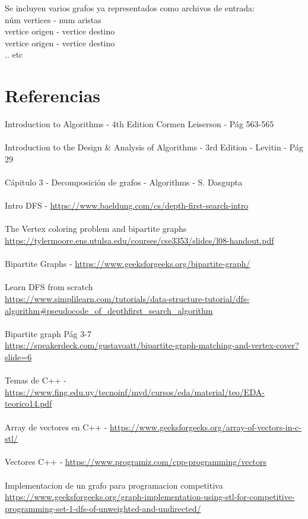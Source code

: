 \documentclass{article}
\begin{document}
Se incluyen varios grafos ya representados como archivos de entrada:\\
núm vertices - num aristas\\
vertice origen - vertice destino\\
vertice origen - vertice destino\\
.. etc\\




\section{Referencias}
Introduction to Algorithms - 4th Edition Cormen Leiserson - Pág 563-565\\\\
Introduction to the Design \& Analysis of Algorithms - 3rd Edition - Levitin - Pág 29\\\\
Cápitulo 3 - Decomposición de grafos - Algorithms - S. Dasgupta\\\\
Intro DFS - \url{https://www.baeldung.com/cs/depth-first-search-intro}\\\\
The Vertex coloring problem and bipartite graphs \\ \url{https://tylermoore.ens.utulsa.edu/courses/cse3353/slides/l08-handout.pdf}\\\\
Bipartite Graphs - \url{https://www.geeksforgeeks.org/bipartite-graph/}\\\\
Learn DFS from scratch \\ \url{https://www.simplilearn.com/tutorials/data-structure-tutorial/dfs-algorithm#pseudocode_of_depthfirst_search_algorithm}\\\\
Bipartite graph Pág 3-7 \\ \url{https://speakerdeck.com/gustavoatt/bipartite-graph-matching-and-vertex-cover?slide=6}\\\\
Temas de C++ - \url{https://www.fing.edu.uy/tecnoinf/mvd/cursos/eda/material/teo/EDA-teorico14.pdf}\\\\
Array de vectores en C++ - \url{https://www.geeksforgeeks.org/array-of-vectors-in-c-stl/}\\\\
Vectores C++ - \url{https://www.programiz.com/cpp-programming/vectors}\\\\
Implementacion de un grafo para programacion competitiva \\ \url{https://www.geeksforgeeks.org/graph-implementation-using-stl-for-competitive-programming-set-1-dfs-of-unweighted-and-undirected/}
\end{document}

